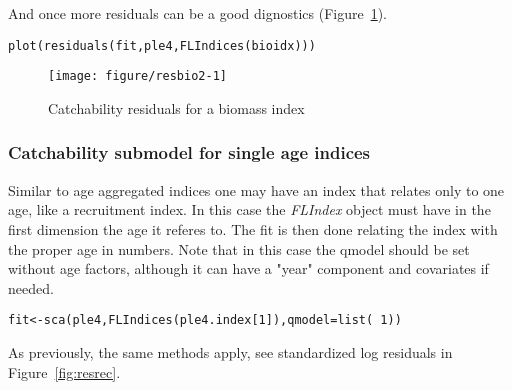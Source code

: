 \documentclass[a4paper,english,10pt]{article}\usepackage[]{graphicx}\usepackage[]{color}
\makeatletter
\def\maxwidth{ %
  \ifdim\Gin@nat@width>\linewidth
    \linewidth
  \else
    \Gin@nat@width
  \fi
}
\newcommand{\hlnum}[1]{\textcolor[rgb]{0.2,0.2,0.2}{#1}}%
\newcommand{\hlopt}[1]{\textcolor[rgb]{0.2,0.2,0.2}{#1}}%
\newcommand{\hlstd}[1]{\textcolor[rgb]{0,0,0}{#1}}%
\newcommand{\hlkwb}[1]{\textcolor[rgb]{0.361,0.506,0.596}{#1}}%
\newcommand{\hlkwc}[1]{\textcolor[rgb]{0.361,0.506,0.596}{#1}}%
\newcommand{\hlkwd}[1]{\textcolor[rgb]{0.361,0.506,0.596}{#1}}%
\newenvironment{kframe}{%
 \def\at@end@of@kframe{}%
 \ifinner\ifhmode%
  \def\at@end@of@kframe{\end{minipage}}%
  \begin{minipage}{\columnwidth}%
 \fi\fi%
 \def\FrameCommand##1{\hskip\@totalleftmargin \hskip-\fboxsep
 \colorbox{shadecolor}{##1}\hskip-\fboxsep
     \hskip-\linewidth \hskip-\@totalleftmargin \hskip\columnwidth}%
 \MakeFramed {\advance\hsize-\width
   \@totalleftmargin\z@ \linewidth\hsize
   \@setminipage}}%
 {\par\unskip\endMakeFramed%
 \at@end@of@kframe}
\newenvironment{knitrout}{}{} %
\newcommand{\class}[1]{{\textit{#1}}}
\makeatother
\begin{document}
And once more residuals can be a good dignostics (Figure~\ref{fig:resbio2}).

\begin{knitrout}
\color{fgcolor}\begin{kframe}
\begin{alltt}
\hlkwd{plot}\hlstd{(}\hlkwd{residuals}\hlstd{(fit, ple4,} \hlkwd{FLIndices}\hlstd{(bioidx)))}
\end{alltt}
\end{kframe}\begin{figure}[H]

{\centering \texttt{[image: figure/resbio2-1]} 

}

\caption[Catchability residuals for a biomass index]{Catchability residuals for a biomass index}\label{fig:resbio2}
\end{figure}


\end{knitrout}

\subsubsection{Catchability submodel for single age indices}

Similar to age aggregated indices one may have an index that relates only to one age, like a recruitment index. In this case the \class{FLIndex} object must have in the first dimension the age it referes to. The fit is then done relating the index with the proper age in numbers. Note that in this case the qmodel should be set without age factors, although it can have a "year" component and covariates if needed.

\begin{knitrout}
\color{fgcolor}\begin{kframe}
\begin{alltt}
\hlstd{fit} \hlkwb{<-} \hlkwd{sca}\hlstd{(ple4,} \hlkwd{FLIndices}\hlstd{(ple4.index[}\hlnum{1}\hlstd{]),} \hlkwc{qmodel}\hlstd{=}\hlkwd{list}\hlstd{(}\hlopt{~}\hlnum{1}\hlstd{))}
\end{alltt}
\end{kframe}
\end{knitrout}

As previously, the same methods apply, see standardized log residuals in Figure~\ref{fig:resrec}.
\end{document}
